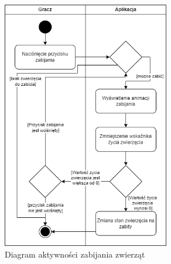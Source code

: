 \begin{figure}[H]
    \centering
        \includegraphics[width=0.65\textwidth]{Graphics/activities/killing_animal.png}
        \caption{Diagram aktywności zabijania zwierząt}
\end{figure}